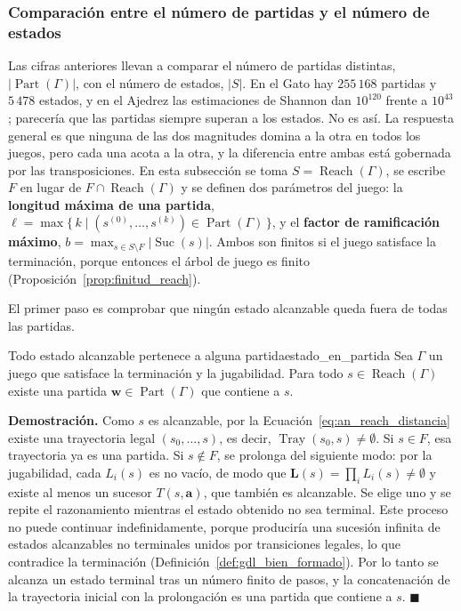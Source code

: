 \subsubsection{Comparación entre el número de partidas y el número de estados}
\label{subsubsec:an_partidas_vs_estados}

Las cifras anteriores llevan a comparar el número de partidas distintas, $|\operatorname{Part}(\Gamma)|$, con el número de estados, $|S|$. En el Gato hay $255\,168$ partidas y $5\,478$ estados, y en el Ajedrez las estimaciones de Shannon dan $10^{120}$ frente a $10^{43}$; parecería que las partidas siempre superan a los estados. No es así. La respuesta general es que ninguna de las dos magnitudes domina a la otra en todos los juegos, pero cada una acota a la otra, y la diferencia entre ambas está gobernada por las transposiciones. En esta subsección se toma $S = \operatorname{Reach}(\Gamma)$, se escribe $F$ en lugar de $F \cap \operatorname{Reach}(\Gamma)$ y se definen dos parámetros del juego: la \textbf{longitud máxima de una partida}, $\ell = \max\{\, k \mid (s^{(0)}, \dots, s^{(k)}) \in \operatorname{Part}(\Gamma) \,\}$, y el \textbf{factor de ramificación máximo}, $b = \max_{s \in S \setminus F} |\operatorname{Suc}(s)|$. Ambos son finitos si el juego satisface la terminación, porque entonces el árbol de juego es finito (Proposición~\ref{prop:finitud_reach}).

El primer paso es comprobar que ningún estado alcanzable queda fuera de todas las partidas.

\begin{proposicion}{Todo estado alcanzable pertenece a alguna partida}{estado_en_partida}
Sea $\Gamma$ un juego que satisface la terminación y la jugabilidad. Para todo $s \in \operatorname{Reach}(\Gamma)$ existe una partida $\mathbf w \in \operatorname{Part}(\Gamma)$ que contiene a $s$.
\end{proposicion}

\noindent\textbf{Demostración.} Como $s$ es alcanzable, por la Ecuación~\eqref{eq:an_reach_distancia} existe una trayectoria legal $(s_0, \dots, s)$, es decir, $\operatorname{Tray}(s_0, s) \neq \emptyset$. Si $s \in F$, esa trayectoria ya es una partida. Si $s \notin F$, se prolonga del siguiente modo: por la jugabilidad, cada $L_i(s)$ es no vacío, de modo que $\mathbf L(s) = \prod_i L_i(s) \neq \emptyset$ y existe al menos un sucesor $T(s, \mathbf a)$, que también es alcanzable. Se elige uno y se repite el razonamiento mientras el estado obtenido no sea terminal. Este proceso no puede continuar indefinidamente, porque produciría una sucesión infinita de estados alcanzables no terminales unidos por transiciones legales, lo que contradice la terminación (Definición~\ref{def:gdl_bien_formado}). Por lo tanto se alcanza un estado terminal tras un número finito de pasos, y la concatenación de la trayectoria inicial con la prolongación es una partida que contiene a $s$. \hfill $\blacksquare$

